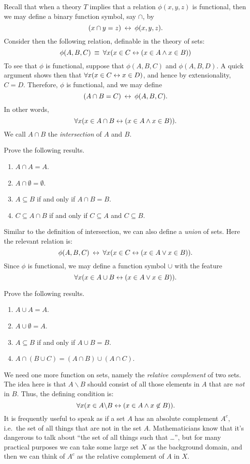 Recall that when a theory $T$ implies that a relation $\phi (x,y,z)$
is functional, then we may define a binary function symbol, say
$\cap$, by
\[ (x\cap y=z) \: \leftrightarrow \: \phi (x,y,z) .\]
Consider then the following relation, definable in the theory of sets:
\[ \phi (A,B,C) \: \equiv \: \forall x(x\in C\leftrightarrow (x\in A\wedge x\in
  B)) \] To see that $\phi$ is functional, suppose that $\phi (A,B,C)$
and $\phi (A,B,D)$.  A quick argument shows then that
$\forall x(x\in C\leftrightarrow x\in D)$, and hence by extensionality, $C=D$.
Therefore, $\phi$ is functional, and we may define
\[ (A\cap B=C) \:\leftrightarrow \: \phi (A,B,C)  .\]
In other words, 
\[ \forall x(x\in A\cap B\leftrightarrow (x\in A\wedge x\in B)) . \] We call
$A\cap B$ the \emph{intersection} of $A$ and $B$.

\begin{exercises} Prove the following results. \begin{enumerate}
  \item $A\cap A=A$.
  \item $A\cap \emptyset = \emptyset$.
  \item $A\subseteq B$ if and only if $A\cap B=B$.
  \item $C\subseteq A\cap B$ if and only if $C\subseteq A$ and
    $C\subseteq B$.    
\end{enumerate} \end{exercises}

Similar to the definition of intersection, we can also define a \emph{union}
of sets.  Here the relevant relation is:
\[ \phi (A,B,C) \: \leftrightarrow \: \forall x(x\in C\leftrightarrow (x\in A\vee x\in B))
  . \] Since $\phi$ is functional, we may define a function symbol
$\cup$ with the feature
\[ \forall x(x\in A\cup B\leftrightarrow (x\in A\vee x\in B)) . \]

\begin{exercises} Prove the following results.
  \begin{enumerate}
 \item $A\cup A=A$.   
 \item $A\cup \emptyset = A$.
 \item $A\subseteq B$ if and only if $A\cup B=B$.  
 \item $A\cap (B\cup C)=(A\cap B)\cup (A\cap C)$.
 \end{enumerate}
\end{exercises}

We need one more function on sets, namely the \emph{relative
  complement} of two sets.  The idea here is that $A\backslash B$
should consist of all those elements in $A$ that are {\it not} in $B$.
Thus, the defining condition is:
\[ \forall x(x\in A\backslash B\leftrightarrow (x\in A\wedge x\not\in B)) . \] It
is frequently useful to speak as if a set $A$ has an absolute
complement $A^c$, i.e.\ the set of all things that are not in the set
$A$.  Mathematicians know that it's dangerous to talk about ``the set
of all things such that \dots '', but for many practical purposes we
can take some large set $X$ as the background domain, and then we can
think of $A^c$ as the relative complement of $A$ in $X$.


